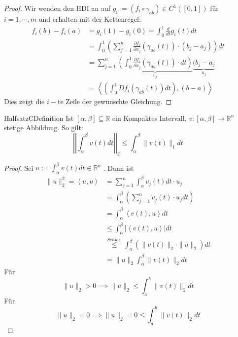 \documentclass[a4paper]{memoir}
\begin{document}
\begin{proof}
	Wir wenden den HDI an auf $ g_{i}:= \left( f_i \circ \gamma_{ab} \right) \in C^{1}\left( [0,1] \right)$ für $ i = 1 , \cdots, m $ und
	erhalten mit der Kettenregel: 
	\begin{align*}
		f_i(b) - f_i(a) &= g_i(1) - g_i(0) = \int_{ 0 }^{ 1 } \frac{d}{dt} g_i(t) dt \\
						&=  \int_{ 0 }^{ 1 } \left( \sum_{j = 1}^{n} \frac{\partial f_i}{\partial x_j} ( \gamma_{ab}(t))
						\cdot (b_j - a_j)\right) dt \\
						&= \sum_{j=1}^{n} \underbrace{\left( \int_{ 0 }^{ 1 } \frac{\partial f_i}{\partial x_j} 
								\left( \gamma _{ab}(t) \right) \cdot
						dt \right)}_{v_j} \underbrace{ (b_j - a_j}_{u_j} \\
						&=  \left< \left( \int_{ 0 }^{ 1 } Df_i ( \gamma_{ab}(t)) dt \right) , (b-a) \right>
	\end{align*}
	Dies zeigt die $ i- $te Zeile der gewünschte Gleichung. 
\end{proof}

\begin{ibox}[]{Halfsatz}{CDefinition}
    Ist $ \left[ \alpha , \beta  \right] \subseteq \mathbb{R}  $ ein Kompaktes Intervall, $ v : \left[ \alpha , \beta 
	\right] \to \mathbb{R}^n  $ stetige Abbildung. So gilt: 
	$$ \left| \left|  \int_{ \alpha }^{ \beta } v(t) dt  \right|  \right| _{2} \leq \int_{ \alpha }^{ \beta } \|v(t)\|_{1} dt $$
\end{ibox}
\begin{proof}
	Sei $ u := \int_{ \alpha }^{ \beta } v(t) dt \in \mathbb{R}^n  $ . Dann ist 
\begin{align*}
	\| u \|_{2}^{2} = \left<u,u \right> &= \sum_{j=1}^{n} \int_{ \alpha }^{ \beta } v_j(t) dt \cdot u_j\\
	&= \int_{ \alpha  }^{ \beta  } \left( \sum_{j = 1}^{n}v_j(t) \cdot u_j dt \right) \\
	&=  \int_{ \alpha  }^{ \beta  } \left<v(t), u \right> dt \\
  & \leq \int_{ \alpha  }^{ \beta } \left| \left<v(t),u\right> \right| dt \\
  & \stackrel{Schwz.}{ \leq } \int_{ \alpha  }^{ \beta  } \left( \| v(t) \|_{2} \cdot \|u \|_{2} \right) dt \\
  &=  \|u \|_{2} \int_{ \alpha  }^{ \beta  } \|v(t) \|_{2}dt
\end{align*}
Für
$$
\|u \|_{2} > 0 \implies \|u \|_{2} \leq  \int_{ a }^{ b } \|v(t) \|_{2} dt
$$
Für
$$
\|u \|_{2} = 0 \implies \|u \|_{2} = 0 \leq  \int_{ a }^{ b } \|v(t) \|_{2} dt
$$
\end{proof}
\end{document}
